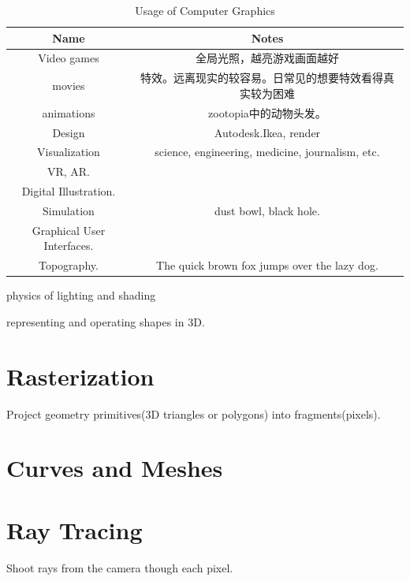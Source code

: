 \documentclass[UTF8]{../computerUniverse}
\begin{document}
\begin{table}[htbp]
    \newcommand{\tabincell}[2]{\begin{tabular}{@{}#1@{}}#2\end
    {tabular}}
    \centering
      \caption{Usage of Computer Graphics }
        \begin{tabular}{cc}
        \toprule
        Name & Notes\\
        \midrule

        Video games & 全局光照，越亮游戏画面越好\\
        movies & 特效。远离现实的较容易。日常见的想要特效看得真实较为困难\\
        animations &zootopia中的动物头发。\\
        Design & Autodesk.Ikea, render\\
        Visualization  &science, engineering, medicine, journalism, etc.\\
        VR, AR.&\\
        Digital Illustration.&\\
        Simulation & dust bowl, black hole.\\
        Graphical User Interfaces.&\\
        Topography.& The quick brown fox jumps over the lazy dog.\\

        \bottomrule
        \end{tabular}
\end{table}


physics of lighting and shading

representing and operating shapes in 3D.



\section{Rasterization}
Project geometry primitives(3D triangles or polygons) into fragments(pixels).



\section{Curves and Meshes}


\section{Ray Tracing}
Shoot rays from the camera though each pixel.
\end{document}
